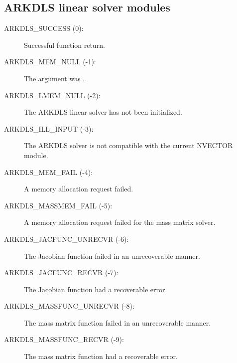 \documentclass[letterpaper,10pt,english]{sphinxmanual}
\begin{document}
\subsection{ARKDLS linear solver modules}
\label{Constants:arkdls-linear-solver-modules}\begin{description}
\item[{ARKDLS\_SUCCESS  (0):}] \leavevmode
Successful function return.

\item[{ARKDLS\_MEM\_NULL  (-1):}] \leavevmode
The  argument was .

\item[{ARKDLS\_LMEM\_NULL  (-2):}] \leavevmode
The ARKDLS linear solver has not been initialized.

\item[{ARKDLS\_ILL\_INPUT  (-3):}] \leavevmode
The ARKDLS solver is not compatible with
the current NVECTOR module.

\item[{ARKDLS\_MEM\_FAIL  (-4):}] \leavevmode
A memory allocation request failed.

\item[{ARKDLS\_MASSMEM\_FAIL  (-5):}] \leavevmode
A memory allocation request failed for the mass matrix solver.

\item[{ARKDLS\_JACFUNC\_UNRECVR  (-6):}] \leavevmode
The Jacobian function failed in an
unrecoverable manner.

\item[{ARKDLS\_JACFUNC\_RECVR  (-7):}] \leavevmode
The Jacobian function had a recoverable error.

\item[{ARKDLS\_MASSFUNC\_UNRECVR  (-8):}] \leavevmode
The mass matrix function failed in an
unrecoverable manner.

\item[{ARKDLS\_MASSFUNC\_RECVR  (-9):}] \leavevmode
The mass matrix function had a recoverable error.

\end{description}
\end{document}
